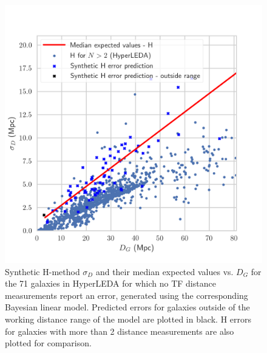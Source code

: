 \documentclass[a4paper,fleqn,usenatbib]{mnras}
\begin{document}
\begin{figure}
	\includegraphics[scale=0.7]{predhl1.png}
    \caption{Synthetic H-method $\sigma_D$ and their median expected values vs. $D_G$ for the 71 galaxies in HyperLEDA for which no TF distance measurements report an error, generated using the corresponding Bayesian linear model. Predicted errors for galaxies outside of the working distance range of the model are plotted in black. H errors for galaxies with more than 2 distance measurements are also plotted for comparison.}
    \label{fig:predhl1}
\end{figure}
\end{document}

